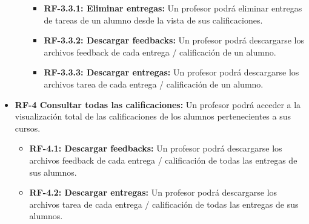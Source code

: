\begin{itemize}
\begin{itemize}
      \begin{itemize}
      \tightlist
      \item
        \textbf{RF-3.3.1: Eliminar entregas:} Un profesor podrá eliminar entregas de tareas de un alumno desde la vista de sus calificaciones.
        
      \item
        \textbf{RF-3.3.2: Descargar feedbacks:} Un profesor podrá descargarse los archivos feedback de cada entrega / calificación de un alumno.
        
      \item
        \textbf{RF-3.3.3: Descargar entregas:} Un profesor podrá descargarse los archivos tarea de cada entrega / calificación de un alumno.
      
      \end{itemize}
      
    \end{itemize}
    
  \item
    \textbf{RF-4 Consultar todas las calificaciones:} Un profesor podrá acceder a la visualización total de las calificaciones de los alumnos pertenecientes a sus cursos.
    
    \begin{itemize}
      \tightlist
      \item
        \textbf{RF-4.1: Descargar feedbacks:} Un profesor podrá descargarse los archivos feedback de cada entrega / calificación de todas las entregas de sus alumnos.
        
      \item
        \textbf{RF-4.2: Descargar entregas:} Un profesor podrá descargarse los archivos tarea de cada entrega / calificación de todas las entregas de sus alumnos.
      
    \end{itemize}

\end{itemize}
 
